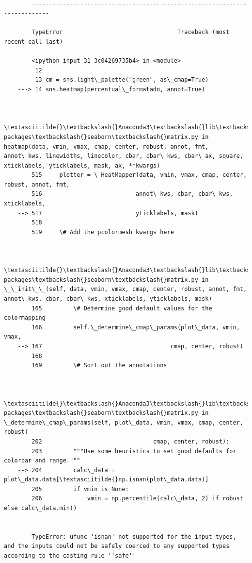 \documentclass[11pt]{article}
\begin{document}
    \begin{Verbatim}[commandchars=\\\{\}]

        ---------------------------------------------------------------------------

        TypeError                                 Traceback (most recent call last)

        <ipython-input-31-3c04269735b4> in <module>
         12 
         13 cm = sns.light\_palette("green", as\_cmap=True)
    ---> 14 sns.heatmap(percentual\_formatado, annot=True)
    

        \textasciitilde{}\textbackslash{}Anaconda3\textbackslash{}lib\textbackslash{}site-packages\textbackslash{}seaborn\textbackslash{}matrix.py in heatmap(data, vmin, vmax, cmap, center, robust, annot, fmt, annot\_kws, linewidths, linecolor, cbar, cbar\_kws, cbar\_ax, square, xticklabels, yticklabels, mask, ax, **kwargs)
        515     plotter = \_HeatMapper(data, vmin, vmax, cmap, center, robust, annot, fmt,
        516                           annot\_kws, cbar, cbar\_kws, xticklabels,
    --> 517                           yticklabels, mask)
        518 
        519     \# Add the pcolormesh kwargs here
    

        \textasciitilde{}\textbackslash{}Anaconda3\textbackslash{}lib\textbackslash{}site-packages\textbackslash{}seaborn\textbackslash{}matrix.py in \_\_init\_\_(self, data, vmin, vmax, cmap, center, robust, annot, fmt, annot\_kws, cbar, cbar\_kws, xticklabels, yticklabels, mask)
        165         \# Determine good default values for the colormapping
        166         self.\_determine\_cmap\_params(plot\_data, vmin, vmax,
    --> 167                                     cmap, center, robust)
        168 
        169         \# Sort out the annotations
    

        \textasciitilde{}\textbackslash{}Anaconda3\textbackslash{}lib\textbackslash{}site-packages\textbackslash{}seaborn\textbackslash{}matrix.py in \_determine\_cmap\_params(self, plot\_data, vmin, vmax, cmap, center, robust)
        202                                cmap, center, robust):
        203         """Use some heuristics to set good defaults for colorbar and range."""
    --> 204         calc\_data = plot\_data.data[\textasciitilde{}np.isnan(plot\_data.data)]
        205         if vmin is None:
        206             vmin = np.percentile(calc\_data, 2) if robust else calc\_data.min()
    

        TypeError: ufunc 'isnan' not supported for the input types, and the inputs could not be safely coerced to any supported types according to the casting rule ''safe''

    \end{Verbatim}
\end{document}
